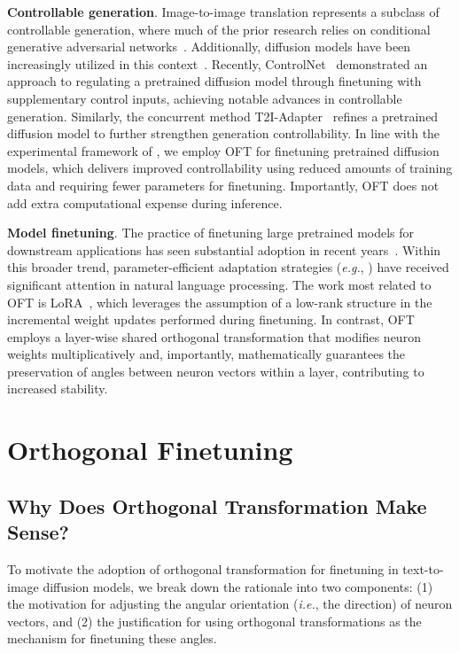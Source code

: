 \textbf{Controllable generation}. Image-to-image translation represents a subclass of controllable generation, where much of the prior research relies on conditional generative adversarial networks~\cite{isola2017image,zhu2017toward,wang2018high,park2019semantic,choi2018stargan}. Additionally, diffusion models have been increasingly utilized in this context~\cite{saharia2022palette,voynov2022sketch,wang2022pretraining}. Recently, ControlNet~\cite{zhang2023adding} demonstrated an approach to regulating a pretrained diffusion model through finetuning with supplementary control inputs, achieving notable advances in controllable generation. Similarly, the concurrent method T2I-Adapter~\cite{mou2023t2i} refines a pretrained diffusion model to further strengthen generation controllability. In line with the experimental framework of \cite{zhang2023adding,mou2023t2i}, we employ OFT for finetuning pretrained diffusion models, which delivers improved controllability using reduced amounts of training data and requiring fewer parameters for finetuning. Importantly, OFT does not add extra computational expense during inference.

\textbf{Model finetuning}. The practice of finetuning large pretrained models for downstream applications has seen substantial adoption in recent years~\cite{devlin2018bert,brown2020language,he2022masked}. Within this broader trend, parameter-efficient adaptation strategies (\emph{e.g.}, \cite{hulora2022,houlsby2019parameter,pfeiffer2020adapterfusion}) have received significant attention in natural language processing. The work most related to OFT is LoRA~\cite{hulora2022}, which leverages the assumption of a low-rank structure in the incremental weight updates performed during finetuning. In contrast, OFT employs a layer-wise shared orthogonal transformation that modifies neuron weights multiplicatively and, importantly, mathematically guarantees the preservation of angles between neuron vectors within a layer, contributing to increased stability.

\section{Orthogonal Finetuning}

\subsection{Why Does Orthogonal Transformation Make Sense?}

To motivate the adoption of orthogonal transformation for finetuning in text-to-image diffusion models, we break down the rationale into two components: (1) the motivation for adjusting the angular orientation (\emph{i.e.}, the direction) of neuron vectors, and (2) the justification for using orthogonal transformations as the mechanism for finetuning these angles.

